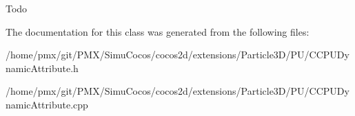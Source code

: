 Todo 

The documentation for this class was generated from the following files\+:\begin{DoxyCompactItemize}
\item 
/home/pmx/git/\+P\+M\+X/\+Simu\+Cocos/cocos2d/extensions/\+Particle3\+D/\+P\+U/C\+C\+P\+U\+Dynamic\+Attribute.\+h\item 
/home/pmx/git/\+P\+M\+X/\+Simu\+Cocos/cocos2d/extensions/\+Particle3\+D/\+P\+U/C\+C\+P\+U\+Dynamic\+Attribute.\+cpp\end{DoxyCompactItemize}
